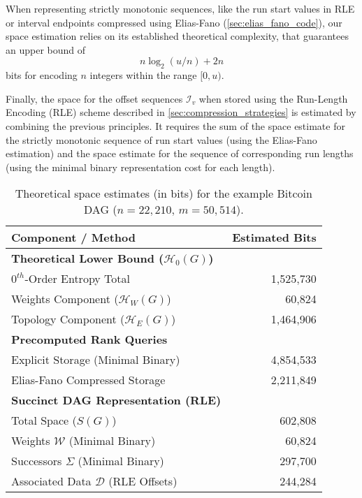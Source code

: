 When representing strictly monotonic sequences, like the run start values in RLE or interval endpoints compressed using Elias-Fano (\autoref{sec:elias_fano_code}), our space estimation relies on its established theoretical complexity, that guarantees an upper bound of
\[n \log_2(u/n) + 2n\]
bits for encoding $n$ integers within the range $[0, u)$.

Finally, the space for the offset sequences $\mathcal{I}_v$ when stored using the Run-Length Encoding (RLE) scheme described in \autoref{sec:compression_strategies} is estimated by combining the previous principles. It requires the sum of the space estimate for the strictly monotonic sequence of run start values (using the Elias-Fano estimation) and the space estimate for the sequence of corresponding run lengths (using the minimal binary representation cost for each length).

\begin{table}[htbp]
    \centering
    \small
    \begin{tabular}{l r}
        \toprule
        Component / Method                                      & Estimated Bits \\
        \midrule
        \textbf{Theoretical Lower Bound ($\mathcal{H}_0(G)$)}   &                \\
        \quad $0^{th}$-Order Entropy Total                      & 1,525,730      \\
        \quad \quad Weights Component ($\mathcal{H}_W(G)$)      & 60,824         \\
        \quad \quad Topology Component ($\mathcal{H}_E(G)$)     & 1,464,906      \\
        \midrule
        \textbf{Precomputed Rank Queries}                       &                \\
        \quad Explicit Storage (Minimal Binary)                 & 4,854,533      \\
        \quad Elias-Fano Compressed Storage                     & 2,211,849      \\
        \midrule
        \textbf{Succinct DAG Representation (RLE)}              &                \\
        \quad Total Space ($S(G)$)                              & 602,808        \\
        \quad \quad Weights $\mathcal{W}$ (Minimal Binary)      & 60,824         \\
        \quad \quad Successors $\Sigma$ (Minimal Binary)        & 297,700        \\
        \quad \quad Associated Data $\mathcal{D}$ (RLE Offsets) & 244,284        \\
        \bottomrule
    \end{tabular}
    \caption{Theoretical space estimates (in bits) for the example Bitcoin DAG ($n=22,210$, $m=50,514$).}
    \label{tab:space_estimates_bitcoin}
\end{table}

